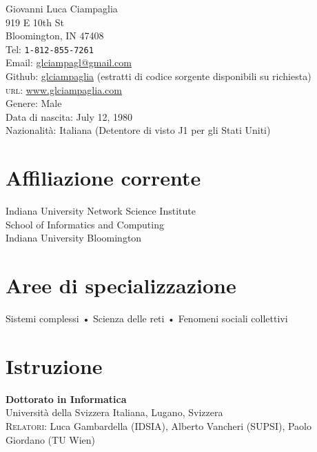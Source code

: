 \documentclass[10pt, letterpaper, italian]{article}
\newcommand{\years}[1]{\marginnote{\small #1}}
\begin{document}
{\LARGE Giovanni Luca Ciampaglia}\\[1cm]
919 E 10th St \\
Bloomington, IN 47408\\[.2cm]
Tel: \texttt{1-812-855-7261}\\
Email: \href{mailto:gciampag@indiana.edu}{glciampagl@gmail.com}\\
Github: \href{http://github.com/glciampaglia}{glciampaglia} (estratti di codice sorgente disponibili su richiesta)\\
\textsc{url}: \href{http://www.glciampaglia.com/}{www.glciampaglia.com}\\[.2cm]
Genere: Male\\
Data di nascita:  July 12, 1980\\
Nazionalità: Italiana (Detentore di visto J1 per gli Stati Uniti)

\section*{Affiliazione corrente}

Indiana University Network Science Institute\\
School of Informatics and Computing\\
Indiana University Bloomington

\section*{Aree di specializzazione}
Sistemi complessi • Scienza delle reti • Fenomeni sociali collettivi


\section*{Istruzione}
\noindent

\years{2012}\textbf{Dottorato in Informatica}\\
%
Università della Svizzera Italiana, Lugano, Svizzera\\
%
\textsc{Relatori}: Luca Gambardella (IDSIA), Alberto Vancheri (SUPSI), Paolo
Giordano (TU Wien)\\[1em]
\end{document}
